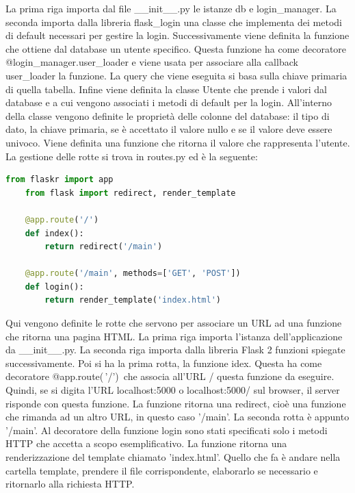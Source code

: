 La prima riga importa dal file \_\_init\_\_.py le istanze db e login\_manager.
La seconda importa dalla libreria flask\_login una classe che implementa dei metodi di default necessari per gestire la login.
Successivamente viene definita la funzione che ottiene dal database un utente specifico.
Questa funzione ha come decoratore @login\_manager.user\_loader e viene usata per associare alla callback user\_loader la funzione.
La query che viene eseguita si basa sulla chiave primaria di quella tabella.
Infine viene definita la classe Utente che prende i valori dal database e a cui vengono associati i metodi di default per la login.
All'interno della classe vengono definite le proprietà delle colonne del database:
il tipo di dato, la chiave primaria, se è accettato il valore nullo e se il valore deve essere univoco.
Viene definita una funzione che ritorna il valore che rappresenta l'utente.\newline
\newline
\hypertarget{lst:flask-creazione-basi-routes}
{La gestione delle rotte si trova in routes.py ed è la seguente:}
\begin{lstlisting}[language=python]
	from flaskr import app
	from flask import redirect, render_template

	@app.route('/')
	def index():
		return redirect('/main')

	@app.route('/main', methods=['GET', 'POST'])
	def login():
		return render_template('index.html')
\end{lstlisting}
Qui vengono definite le rotte che servono per associare un URL ad una funzione che ritorna una pagina HTML.
La prima riga importa l'istanza dell'applicazione da \_\_init\_\_.py.
La seconda riga importa dalla libreria Flask 2 funzioni spiegate successivamente.
Poi si ha la prima rotta, la funzione idex.
Questa ha come decoratore @app.route(\,'/')\, che associa all'URL / questa funzione da eseguire.
Quindi, se si digita l'URL localhost:5000 o localhost:5000/ sul browser, il server risponde con questa funzione.
La funzione ritorna una redirect, cioè una funzione che rimanda ad un altro URL, in questo caso '/main'.
La seconda rotta è appunto '/main'.
Al decoratore della funzione login sono stati specificati solo i metodi HTTP che accetta a scopo esemplificativo.
La funzione ritorna una renderizzazione del template chiamato 'index.html'.
Quello che fa è andare nella cartella template, prendere il file corrispondente, 
elaborarlo se necessario e ritornarlo alla richiesta HTTP.\newline
\newline
